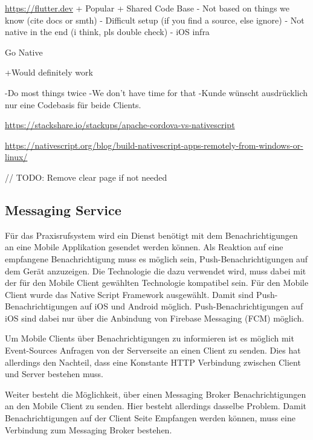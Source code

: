  
 \url{https://flutter.dev}
    + Popular
    + Shared Code Base
    - Not based on things we know (cite docs or smth)
    - Difficult setup (if you find a source, else ignore)
    - Not native in the end (i think, pls double check)
    - iOS infra


Go Native

    +Would definitely work

    -Do most things twice
    -We don't have time for that
    -Kunde wünscht ausdrücklich nur eine Codebasis für beide Clients.

\url{https://stackshare.io/stackups/apache-cordova-vs-nativescript}

\url{https://nativescript.org/blog/build-nativescript-apps-remotely-from-windows-or-linux/ }

// TODO: Remove clear page if not needed
\clearpage

\subsection{Messaging Service}\label{subsec:messaging-eval}

Für das Praxisrufsystem wird ein Dienst benötigt mit dem Benachrichtigungen an eine Mobile Applikation gesendet werden können.
Als Reaktion auf eine empfangene Benachrichtigung muss es möglich sein, Push-Benachrichtigungen auf dem Gerät anzuzeigen.
Die Technologie die dazu verwendet wird, muss dabei mit der für den Mobile Client gewählten Technologie kompatibel sein.
Für den Mobile Client wurde das Native Script Framework ausgewählt.
Damit sind Push-Benachrichtigungen auf iOS und Android möglich.
Push-Benachrichtigungen auf iOS sind dabei nur über die Anbindung von Firebase Messaging (FCM) möglich.\cite{nativescript-push}

Um Mobile Clients über Benachrichtigungen zu informieren ist es möglich mit Event-Sources\cite{event-source} Anfragen von der Serverseite an einen Client zu senden.
Dies hat allerdings den Nachteil, dass eine Konstante HTTP Verbindung zwischen Client und Server bestehen muss.

Weiter besteht die Möglichkeit, über einen Messaging Broker Benachrichtigungen an den Mobile Client zu senden.
Hier besteht allerdings dasselbe Problem.
Damit Benachrichtigungen auf der Client Seite Empfangen werden können, muss eine Verbindung zum Messaging Broker bestehen.

